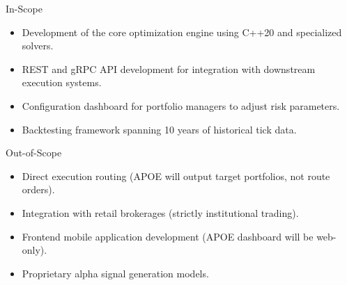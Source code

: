 \begin{minipage}[t]{0.48\textwidth}
  \begin{callout-box}{In-Scope}
    \begin{itemize}[leftmargin=12pt]
      \item Development of the core optimization engine using C++20 and specialized solvers.
      \item REST and gRPC API development for integration with downstream execution systems.
      \item Configuration dashboard for portfolio managers to adjust risk parameters.
      \item Backtesting framework spanning 10 years of historical tick data.
    \end{itemize}
  \end{callout-box}
\end{minipage}
\hfill
\begin{minipage}[t]{0.48\textwidth}
  \begin{callout-box}{Out-of-Scope}
    \begin{itemize}[leftmargin=12pt]
      \item Direct execution routing (APOE will output target portfolios, not route orders).
      \item Integration with retail brokerages (strictly institutional trading).
      \item Frontend mobile application development (APOE dashboard will be web-only).
      \item Proprietary alpha signal generation models.
    \end{itemize}
  \end{callout-box}
\end{minipage}
\par
